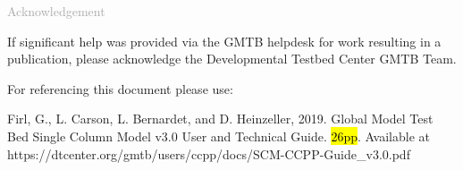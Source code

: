 \begin{titlepage}
\vspace*{0.5cm}
\noindent

\begin{flushleft}
\textcolor{darkgray}{\LARGE Acknowledgement}
\vspace*{1cm}\par

If significant help was provided via the GMTB helpdesk for work resulting in a publication, please acknowledge the Developmental Testbed Center GMTB Team.\\
\vspace*{1cm}\par
For referencing this document please use:\\
\vspace*{1cm}\par
Firl, G., L. Carson, L. Bernardet, and D. Heinzeller, 2019. Global Model Test Bed Single Column Model v3.0 User and Technical Guide. \hl{26pp}. Available at https://dtcenter.org/gmtb/users/ccpp/docs/SCM-CCPP-Guide\_v3.0.pdf

\end{flushleft}
\end{titlepage}
\pagebreak{}
